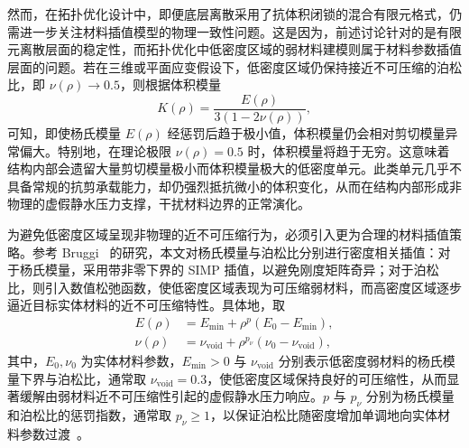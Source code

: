 

然而，在拓扑优化设计中，即便底层离散采用了抗体积闭锁的混合有限元格式，仍需进一步关注材料插值模型的物理一致性问题。这是因为，前述讨论针对的是有限元离散层面的稳定性，而拓扑优化中低密度区域的弱材料建模则属于材料参数插值层面的问题。若在三维或平面应变假设下，低密度区域仍保持接近不可压缩的泊松比，即 $\nu(\rho)\to0.5$，则根据体积模量
\[
K(\rho)=\frac{E(\rho)}{3(1-2\nu(\rho))},
\]
可知，即使杨氏模量 $E(\rho)$ 经惩罚后趋于极小值，体积模量仍会相对剪切模量异常偏大。特别地，在理论极限 $\nu(\rho)=0.5$ 时，体积模量将趋于无穷。这意味着结构内部会遗留大量剪切模量极小而体积模量极大的低密度单元。此类单元几乎不具备常规的抗剪承载能力，却仍强烈抵抗微小的体积变化，从而在结构内部形成非物理的虚假静水压力支撑，干扰材料边界的正常演化。

为避免低密度区域呈现非物理的近不可压缩行为，必须引入更为合理的材料插值策略。参考 Bruggi~\cite{bruggiTopologyOptimizationIncompressible2007a} 的研究，本文对杨氏模量与泊松比分别进行密度相关插值：对于杨氏模量，采用带非零下界的 SIMP 插值，以避免刚度矩阵奇异；对于泊松比，则引入数值松弛函数，使低密度区域表现为可压缩弱材料，而高密度区域逐步逼近目标实体材料的近不可压缩特性。具体地，取
\[
\begin{aligned}  
	E(\rho) &= E_{\min} + \rho^p (E_{0} - E_{\min}), \\  
	\nu(\rho) &= \nu_{\text{void}} + \rho^{p_{\nu}} (\nu_{0} - \nu_{\text{void}}),  
\end{aligned}
\]
其中，$E_0,\nu_0$ 为实体材料参数，$E_{\min}>0$ 与 $\nu_{\mathrm{void}}$ 分别表示低密度弱材料的杨氏模量下界与泊松比，通常取 $\nu_{\mathrm{void}}=0.3$，使低密度区域保持良好的可压缩性，从而显著缓解由弱材料近不可压缩性引起的虚假静水压力响应。$p$ 与 $p_\nu$ 分别为杨氏模量和泊松比的惩罚指数，通常取 $p_\nu\ge 1$，以保证泊松比随密度增加单调地向实体材料参数过渡~\cite{bruggiTopologyOptimizationIncompressible2007a}。


